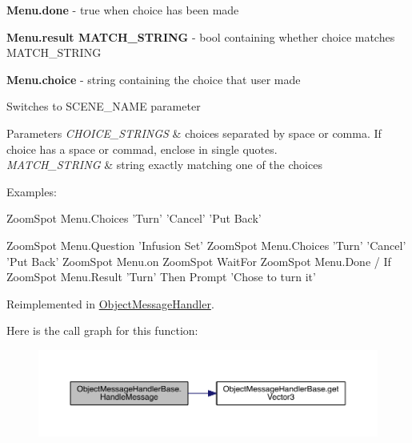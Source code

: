{\bfseries  Menu.\+done } -\/ true when choice has been made

{\bfseries  Menu.\+result M\+A\+T\+C\+H\+\_\+\+S\+T\+R\+I\+NG } -\/ bool containing whether choice matches M\+A\+T\+C\+H\+\_\+\+S\+T\+R\+I\+NG

{\bfseries  Menu.\+choice } -\/ string containing the choice that user made

Switches to S\+C\+E\+N\+E\+\_\+\+N\+A\+ME parameter 
\begin{DoxyParams}{Parameters}
{\em C\+H\+O\+I\+C\+E\+\_\+\+S\+T\+R\+I\+N\+GS} & choices separated by space or comma. If choice has a space or commad, enclose in single quotes. \\
\hline
{\em M\+A\+T\+C\+H\+\_\+\+S\+T\+R\+I\+NG} & string exactly matching one of the choices\\
\hline
\end{DoxyParams}
Examples\+:
\begin{DoxyCode}
 ZoomSpot Menu.Choices \textcolor{stringliteral}{'Turn'} \textcolor{stringliteral}{'Cancel'} \textcolor{stringliteral}{'Put Back'}

 ZoomSpot Menu.Question \textcolor{stringliteral}{'Infusion Set'}
 ZoomSpot Menu.Choices \textcolor{stringliteral}{'Turn'} \textcolor{stringliteral}{'Cancel'} \textcolor{stringliteral}{'Put Back'}
 ZoomSpot Menu.on ZoomSpot
 WaitFor
     ZoomSpot Menu.Done
/ If
     ZoomSpot Menu.Result \textcolor{stringliteral}{'Turn'}
 Then
      Prompt \textcolor{stringliteral}{'Chose to turn it'}
\end{DoxyCode}
 



Reimplemented in \hyperlink{class_object_message_handler_ae72846a48ca851170d68bef2ca496f07}{Object\+Message\+Handler}.



Here is the call graph for this function\+:\nopagebreak
\begin{figure}[H]
\begin{center}
\leavevmode
\includegraphics[width=350pt]{group___o_m_h___commands_ga86c01c29831daf58f5b0ecc3ce65ee58_cgraph}
\end{center}
\end{figure}


